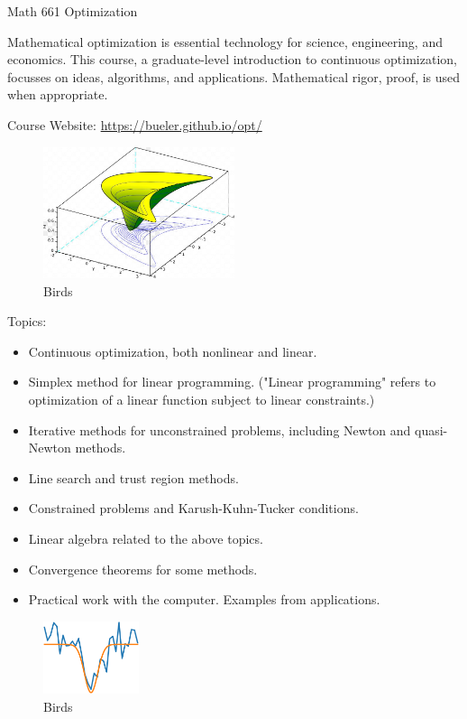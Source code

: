 \documentclass[12pt]{amsart}
\begin{document}
\begin{center}
\Huge Math 661 Optimization
\end{center}

\thispagestyle{empty}

Mathematical optimization is essential technology for science, engineering, and economics.  This course, a graduate-level introduction to continuous optimization, focusses on ideas, algorithms, and applications.  Mathematical rigor, proof, is used when appropriate.

Course Website: \url{https://bueler.github.io/opt/}

\begin{figure}
  \centering
    \includegraphics[width=0.5\textwidth]{../images/banana.png}
\captionsetup{margin=1.2cm}
  \caption{Birds}
\end{figure}

Topics:

\begin{itemize}
\item    Continuous optimization, both nonlinear and linear.
\item     Simplex method for linear programming. ("Linear programming" refers to optimization of a linear function subject to linear constraints.)
\item     Iterative methods for unconstrained problems, including Newton and quasi-Newton methods.
\item     Line search and trust region methods.
\item     Constrained problems and Karush-Kuhn-Tucker conditions.
\item     Linear algebra related to the above topics.
\item     Convergence theorems for some methods.
\item     Practical work with the computer. Examples from applications.
\end{itemize}


\begin{figure}
  \centering
    \includegraphics[width=0.25\textwidth]{../images/smooth-noisy.png}
\captionsetup{margin=1.2cm}
  \caption{Birds}
\end{figure}
\end{document}
